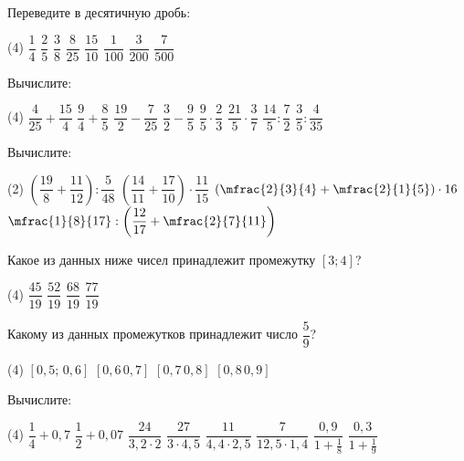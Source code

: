 %
%

\begin{class}[number=1]
	\begin{listofex}
		\item Переведите в десятичную дробь:
		\begin{tasks}(4)
			\task \( \dfrac{1}{4} \)
			\task \( \dfrac{2}{5} \)
			\task \( \dfrac{3}{8} \)
			\task \( \dfrac{8}{25} \)
			\task \( \dfrac{15}{10} \)
			\task \( \dfrac{1}{100} \)
			\task \( \dfrac{3}{200} \)
			\task \( \dfrac{7}{500} \)
		\end{tasks}
		\item Вычислите:
		\begin{tasks}(4)
			\task \( \dfrac{4}{25}+\dfrac{15}{4} \)
			\task \( \dfrac{9}{4}+\dfrac{8}{5} \)
			\task \( \dfrac{19}{2}-\dfrac{7}{25} \)
			\task \( \dfrac{3}{2}-\dfrac{9}{5} \)
			\task \( \dfrac{9}{5}\cdot\dfrac{2}{3} \)
			\task \( \dfrac{21}{5}\cdot\dfrac{3}{7} \)
			\task \( \dfrac{14}{5}:\dfrac{7}{2} \)
			\task \( \dfrac{3}{5}:\dfrac{4}{35} \)
		\end{tasks}
		\item Вычислите:
		\begin{tasks}(2)
			\task \( \left( \dfrac{19}{8}+\dfrac{11}{12} \right):\dfrac{5}{48} \)
			\task \( \left( \dfrac{14}{11}+\dfrac{17}{10} \right)\cdot\dfrac{11}{15} \)
			\task \( \left( \mfrac{2}{3}{4}+\mfrac{2}{1}{5} \right)\cdot16 \)
			\task \( \mfrac{1}{8}{17}:\left( \dfrac{12}{17}+\mfrac{2}{7}{11} \right) \)
		\end{tasks}
		\item Какое из данных ниже чисел принадлежит промежутку \( [3;4] \)?
		\begin{tasks}(4)
			\task \( \dfrac{45}{19} \)
			\task \( \dfrac{52}{19} \)
			\task \( \dfrac{68}{19} \)
			\task \( \dfrac{77}{19} \)
		\end{tasks}
		\item Какому из данных промежутков принадлежит число \( \dfrac{5}{9} \)?
		\begin{tasks}(4)
			\task \( [0,5; \, 0,6] \)
			\task \( [0,6 \, 0,7] \)
			\task \( [0,7 \, 0,8] \)
			\task \( [0,8 \, 0,9] \)
		\end{tasks}
		\item Вычислите:
		\begin{tasks}(4)
			\task \( \dfrac{1}{4}+0,7 \)
			\task \( \dfrac{1}{2}+0,07 \)
			\task \( \dfrac{24}{3,2\cdot2} \)
			\task \( \dfrac{27}{3\cdot4,5} \)
			\task \( \dfrac{11}{4,4\cdot2,5} \)
			\task \( \dfrac{7}{12,5\cdot1,4} \)
			\task \( \dfrac{0,9}{1+\frac{1}{8}} \)
			\task \( \dfrac{0,3}{1+\frac{1}{9}} \)
		\end{tasks}
	\end{listofex}
\end{class}

